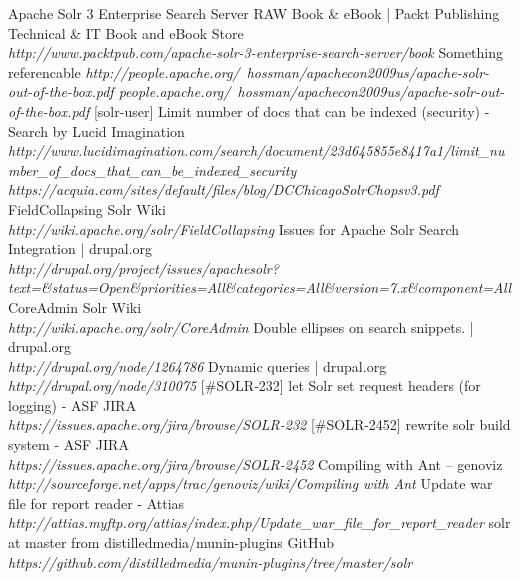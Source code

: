 \begin{thebibliography}{99}
		Apache Solr 3 Enterprise Search Server RAW Book \& eBook | Packt Publishing Technical \& IT Book and eBook Store\\
		\emph{http://www.packtpub.com/apache-solr-3-enterprise-search-server/book}
		Something referencable
		\emph{http://people.apache.org/~hossman/apachecon2009us/apache-solr-out-of-the-box.pdf people.apache.org/~hossman/apachecon2009us/apache-solr-out-of-the-box.pdf}
		[solr-user] Limit number of docs that can be indexed (security) - Search by Lucid Imagination\\
		\emph{http://www.lucidimagination.com/search/document/23d645855e8417a1/limit\_number\_of\_docs\_that\_can\_be\_indexed\_security}
		\emph{https://acquia.com/sites/default/files/blog/DC\-Chicago\-Solr\-Chops\-v3.pdf}
	 	FieldCollapsing \- Solr Wiki\\
		\emph{http://wiki.apache.org/solr/FieldCollapsing}
		Issues for Apache Solr Search Integration | drupal.org\\
		\emph{http://drupal.org/project/issues/apachesolr?text=\&status=Open\&priorities=All\&categories=All\&version=7.x\&component=All}
		CoreAdmin \- Solr Wiki\\
		\emph{http://wiki.apache.org/solr/CoreAdmin}
		Double ellipses on search snippets. | drupal.org\\
		\emph{http://drupal.org/node/1264786}
		Dynamic queries | drupal.org\\
		\emph{http://drupal.org/node/310075}
		[\#SOLR-232] let Solr set request headers (for logging) - ASF JIRA\\
		\emph{https://issues.apache.org/jira/browse/SOLR-232}
	 	[\#SOLR-2452] rewrite solr build system - ASF JIRA\\
		\emph{https://issues.apache.org/jira/browse/SOLR-2452}
		Compiling with Ant – genoviz\\
		\emph{http://sourceforge.net/apps/trac/genoviz/wiki/Compiling with Ant}
		Update war file for report reader - Attias\\
		\emph{http://attias.myftp.org/attias/index.php/Update\_war\_file\_for\_report\_reader}
		solr at master from distilledmedia/munin-plugins \- GitHub\\
		\emph{https://github.com/distilledmedia/munin-plugins/tree/master/solr}

\end{thebibliography}
